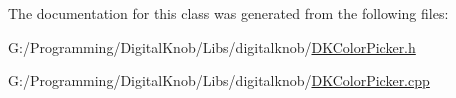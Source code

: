 The documentation for this class was generated from the following files\-:\begin{DoxyCompactItemize}
\item 
G\-:/\-Programming/\-Digital\-Knob/\-Libs/digitalknob/\hyperlink{_d_k_color_picker_8h}{D\-K\-Color\-Picker.\-h}\item 
G\-:/\-Programming/\-Digital\-Knob/\-Libs/digitalknob/\hyperlink{_d_k_color_picker_8cpp}{D\-K\-Color\-Picker.\-cpp}\end{DoxyCompactItemize}
